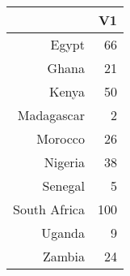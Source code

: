 \begin{table}[ht]
\centering
\begin{tabular}{rr}
  \hline
 & V1 \\ 
  \hline
Egypt &  66 \\ 
  Ghana &  21 \\ 
  Kenya &  50 \\ 
  Madagascar &   2 \\ 
  Morocco &  26 \\ 
  Nigeria &  38 \\ 
  Senegal &   5 \\ 
  South Africa & 100 \\ 
  Uganda &   9 \\ 
  Zambia &  24 \\ 
   \hline
\end{tabular}
\end{table}
